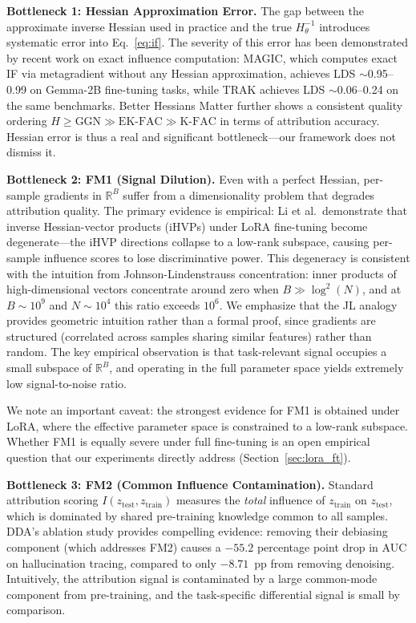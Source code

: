 \documentclass{article}
\begin{document}
\textbf{Bottleneck 1: Hessian Approximation Error.} The gap between the approximate inverse Hessian used in practice and the true $H_\theta^{-1}$ introduces systematic error into Eq.~\ref{eq:if}. The severity of this error has been demonstrated by recent work on exact influence computation: MAGIC, which computes exact IF via metagradient without any Hessian approximation, achieves LDS $\sim$0.95--0.99 on Gemma-2B fine-tuning tasks, while TRAK achieves LDS $\sim$0.06--0.24 on the same benchmarks. Better Hessians Matter further shows a consistent quality ordering $H \geq \text{GGN} \gg \text{EK-FAC} \gg \text{K-FAC}$ in terms of attribution accuracy. Hessian error is thus a real and significant bottleneck---our framework does not dismiss it.

\textbf{Bottleneck 2: FM1 (Signal Dilution).} Even with a perfect Hessian, per-sample gradients in $\mathbb{R}^B$ suffer from a dimensionality problem that degrades attribution quality. The primary evidence is empirical: Li et al.\ demonstrate that inverse Hessian-vector products (iHVPs) under LoRA fine-tuning become degenerate---the iHVP directions collapse to a low-rank subspace, causing per-sample influence scores to lose discriminative power. This degeneracy is consistent with the intuition from Johnson-Lindenstrauss concentration: inner products of high-dimensional vectors concentrate around zero when $B \gg \log^2(N)$, and at $B \sim 10^9$ and $N \sim 10^4$ this ratio exceeds $10^6$. We emphasize that the JL analogy provides geometric intuition rather than a formal proof, since gradients are structured (correlated across samples sharing similar features) rather than random. The key empirical observation is that task-relevant signal occupies a small subspace of $\mathbb{R}^B$, and operating in the full parameter space yields extremely low signal-to-noise ratio.

We note an important caveat: the strongest evidence for FM1 is obtained under LoRA, where the effective parameter space is constrained to a low-rank subspace. Whether FM1 is equally severe under full fine-tuning is an open empirical question that our experiments directly address (Section~\ref{sec:lora_ft}).

\textbf{Bottleneck 3: FM2 (Common Influence Contamination).} Standard attribution scoring $I(z_\text{test}, z_\text{train})$ measures the \emph{total} influence of $z_\text{train}$ on $z_\text{test}$, which is dominated by shared pre-training knowledge common to all samples. DDA's ablation study provides compelling evidence: removing their debiasing component (which addresses FM2) causes a $-55.2$ percentage point drop in AUC on hallucination tracing, compared to only $-8.71$~pp from removing denoising. Intuitively, the attribution signal is contaminated by a large common-mode component from pre-training, and the task-specific differential signal is small by comparison.
\end{document}
